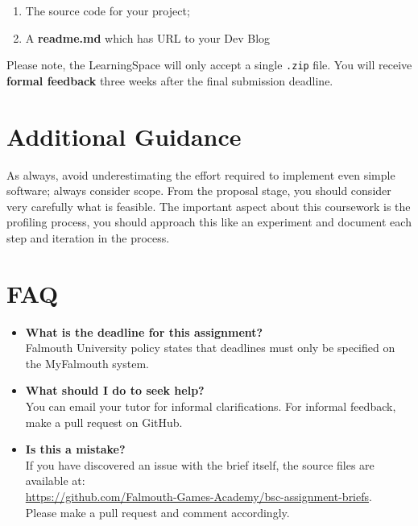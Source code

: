 \documentclass{../../fal_assignment}
\begin{document}
\begin{enumerate}[label=(\alph*)]
	\item The source code for your project;
	\item A \textbf{readme.md} which has URL to your Dev Blog
\end{enumerate}

Please note, the LearningSpace will only accept a single \texttt{.zip} file. You will receive \textbf{formal feedback} three weeks after the final submission deadline.

\section*{Additional Guidance}

As always, avoid underestimating the effort required to implement even simple software; always consider scope.
From the proposal stage, you should consider very carefully what is feasible. The important aspect about this coursework is the profiling process, you should approach this like an experiment and document each step and iteration in the process.



\section*{FAQ}

\begin{itemize}
	\item 	\textbf{What is the deadline for this assignment?} \\ 
    		Falmouth University policy states that deadlines must only be specified on the MyFalmouth system.
    		
	\item 	\textbf{What should I do to seek help?} \\ 
    		You can email your tutor for informal clarifications. For informal feedback, make a pull request on GitHub. 
    		
    	\item 	\textbf{Is this a mistake?} \\ 	
    		If you have discovered an issue with the brief itself, the source files are available at: \\
    		\url{https://github.com/Falmouth-Games-Academy/bsc-assignment-briefs}.\\
    		 Please make a pull request and comment accordingly.
\end{itemize}
\end{document}
